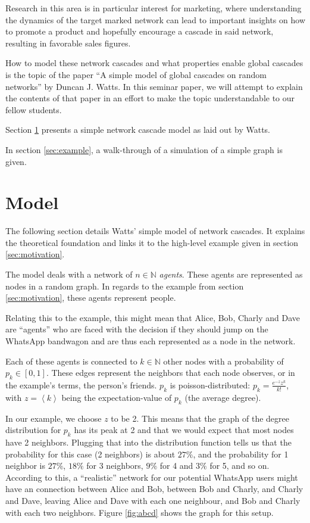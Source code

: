 \documentclass{sig-alternate-05-2015}
\begin{document}
Research in this area is in particular interest for marketing, where understanding the dynamics of the target marked network can lead to important insights on how to promote a product and hopefully encourage a cascade in said network, resulting in favorable sales figures.

How to model these network cascades and what properties enable global cascades is the topic of the paper ``A simple model of global cascades on random networks'' by Duncan J. Watts\cite{simplemodel}. In this seminar paper, we will attempt to explain the contents of that paper in an effort to make the topic understandable to our fellow students.


\par\bigskip

Section \ref{sec:model} presents a simple network cascade model as laid out by Watts\cite{simplemodel}.

In section \ref{sec:example}, a walk-through of a simulation of a simple graph is given.


\section{Model}\label{sec:model}

The following section details Watts' simple model of network cascades\cite{simplemodel}. It explains the theoretical foundation and links it to the high-level example given in section \ref{sec:motivation}.

The model deals with a network of $n \in \mathbb{N}$ \emph{agents}. These agents are represented as nodes in a random graph. In regards to the example from section \ref{sec:motivation}, these agents represent people.

Relating this to the example, this might mean that Alice, Bob, Charly and Dave are ``agents'' who are faced with the decision if they should jump on the WhatsApp bandwagon and are thus each represented as a node in the network.

Each of these agents is connected to $k \in \mathbb{N}$ other nodes with a probability of $p_k \in [0,1]$. These edges represent the neighbors that each node observes, or in the example's terms, the person's friends. $p_k$ is poisson-distributed: $p_k = \frac{e^{-z}z^k}{k!}$, with $z = \left<k\right>$ being the expectation-value of $p_k$ (the average degree).

In our example, we choose $z$ to be 2. This means that the graph of the degree distribution for $p_k$ has its peak at 2 and that we would expect that most nodes have 2 neighbors. Plugging that into the distribution function tells us that the probability for this case (2 neighbors) is about $27\%$, and the probability for 1 neighbor is $27\%$, $18\%$ for 3 neighbors, $9\%$ for 4 and $3\%$ for 5, and so on. According to this, a ``realistic'' network for our potential WhatsApp users might have an connection between Alice and Bob, between Bob and Charly, and Charly and Dave, leaving Alice and Dave with each one neighbour, and Bob and Charly with each two neighbors. Figure \ref{fig:abcd} shows the graph for this setup.
\end{document}
